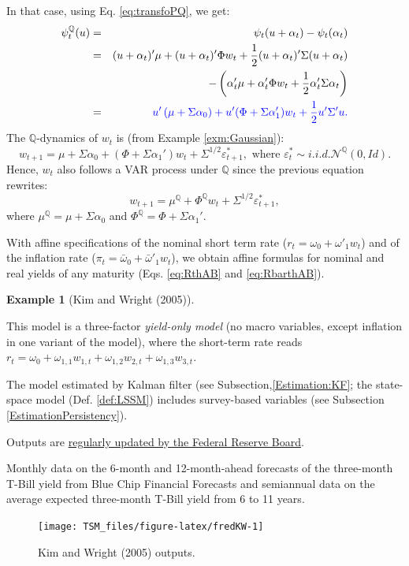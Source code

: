 \documentclass[
  12pt,
]{book}
\theoremstyle{definition}
\theoremstyle{definition}
\newtheorem{example}{Example}[chapter]
\theoremstyle{definition}
\theoremstyle{definition}
\theoremstyle{remark}
\begin{document}
In that case, using Eq. \eqref{eq:transfoPQ}, we get:
\begin{eqnarray*}
\psi_t^{\mathbb{Q}}(u) &=& \psi_t(u + \alpha_t) - \psi_t(\alpha_t)\\
&=& (u + \alpha_t)'\mu + (u + \alpha_t)'\Phi w_t + \frac{1}{2}(u + \alpha_t)'\Sigma(u + \alpha_t) \\
&& - \left(\alpha_t'\mu + \alpha_t'\Phi w_t + \frac{1}{2}\alpha_t'\Sigma\alpha_t\right) \\
&=& \color{blue}{u' \left(\mu + \Sigma \alpha_0 \right) + u'(\Phi + \Sigma \alpha_1')w_t  + \frac{1}{2}u'\Sigma'u}.
\end{eqnarray*}
The \(\mathbb{Q}\)-dynamics of \(w_t\) is (from Example \ref{exm:Gaussian}):
\[
w_{t+1} = \mu + \Sigma  \alpha_0 + (\Phi + \Sigma \alpha_1')  w_{t} + \Sigma^{1/2} \varepsilon^*_{t+1}, \mbox{ where } \varepsilon^*_{t} \sim  i.i.d. \mathcal{N}^{\mathbb{Q}}(0,Id).
\]
Hence, \(w_t\) also follows a VAR process under \(\mathbb{Q}\) since the previous equation rewrites:
\[
w_{t+1} = \mu^{\mathbb{Q}} + \Phi^{\mathbb{Q}} w_{t} + \Sigma^{1/2} \varepsilon^*_{t+1},
\]
where \(\mu^{\mathbb{Q}} = \mu + \Sigma \alpha_0\) and \(\Phi^{\mathbb{Q}}=\Phi + \Sigma \alpha_1'\).

With affine specifications of the nominal short term rate (\(r_{t} = \omega_0 + \omega'_1 w_t\)) and of the inflation rate (\(\pi_{t} = \bar\omega_0 + \bar\omega'_1 w_t\)), we obtain affine formulas for nominal and real yields of any maturity (Eqs. \eqref{eq:RthAB} and \eqref{eq:RbarthAB}).

\begin{example}[Kim and Wright (2005)]
\protect\hypertarget{exm:KimWright}{}\label{exm:KimWright}

This model is a three-factor \emph{yield-only model} (no macro variables, except inflation in one variant of the model), where the short-term rate reads \(r_t = \omega_0 + \omega_{1,1} w_{1,t} +\omega_{1,2} w_{2,t} +\omega_{1,3} w_{3,t}\).

The model estimated by Kalman filter (see Subsection,\ref{Estimation:KF}; the state-space model (Def. \ref{def:LSSM}) includes survey-based variables (see Subsection \ref{EstimationPersistency}).

Outputs are \href{https://www.federalreserve.gov/pubs/feds/2005/200533/200533abs.html}{regularly updated by the Federal Reserve Board}.

Monthly data on the 6-month and 12-month-ahead forecasts of the three-month T-Bill yield from Blue Chip Financial Forecasts and semiannual data on the average expected three-month T-Bill yield from 6 to 11 years.

\begin{figure}
\texttt{[image: TSM\_files/figure-latex/fredKW-1]} \caption{Kim and Wright (2005) outputs.}\label{fig:fredKW}
\end{figure}

\end{example}
\end{document}
